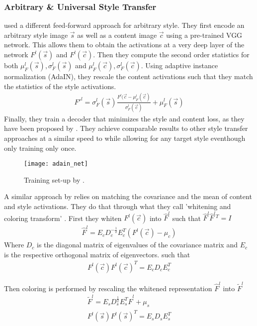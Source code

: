 \subsubsection{Arbitrary \& Universal Style Transfer}
\citeauthor*{AdaIN} used a different feed-forward approach for arbitrary style.
They first encode an arbitrary style image $\vec{s}$ as well as a content image $\vec{c}$ using a pre-trained VGG network.
This allows them to obtain the activations at a very deep layer of the network $F^l(\vec{s})$ and $F^l(\vec{c})$.
Then they compute the second order statistics for both $\mu_F^l(\vec{s}), \sigma_F^l(\vec{s})$ and $\mu_F^l(\vec{c}), \sigma_F^l(\vec{c})$.
Using adaptive instance normalization (AdaIN), they rescale the content activations such that they match the statistics of the style activations.
\begin{align}
    F'^l = \sigma_F^l(\vec{s}) \frac{F^l(\vec{c} - \mu_F^l(\vec{c})}{\sigma_F^l(\vec{c})} + \mu_F^l(\vec{s}) 
\end{align}
Finally, they train a decoder that minimizes the style and content loss, as they have been proposed by \citeauthor*{gatys}.
They achieve comparable results to other style transfer approaches at a similar speed to \citeauthor*{johnson} while allowing for any target style eventhough only training only once.
\begin{figure*}
    \texttt{[image: adain\_net]}
    \caption[]{Training set-up by \citeauthor*{AdaIN}. \cite{AdaIN}}
\end{figure*}

A similar approach by \citeauthor*{WCT} relies on matching the covariance and the mean of content and style activations.
They do that through what they call 'whitening and coloring transform' \cite{WCT}.
First they whiten $F^l(\vec{c})$ into $\hat{F}^l$ such that $\hat{F}^l \hat{F}^l{}^T = I$
\begin{align}
    \hat{F}^l = E_c D_c^{-\frac{1}{2}} E_c^T (F^l(\vec{c}) - \mu_c)
\end{align}
Where $D_c$ is the diagonal matrix of eigenvalues of the covariance matrix and $E_c$ is the respective orthogonal matrix of eigenvectors.
such that
\begin{align}
    F^l(\vec{c}) F^l(\vec{c})^T = E_c D_c E_c^T
\end{align}

Then coloring is performed by rescaling the whitened representation $\hat{F}^l$ into $\tilde{F}^l$
\begin{align}
    \tilde{F}^l = E_s D_s^{\frac{1}{2}} E_s^T \hat{F}^l + \mu_s \\
    F^l(\vec{s}) F^l(\vec{s})^T = E_s D_s E_s^T
\end{align}

